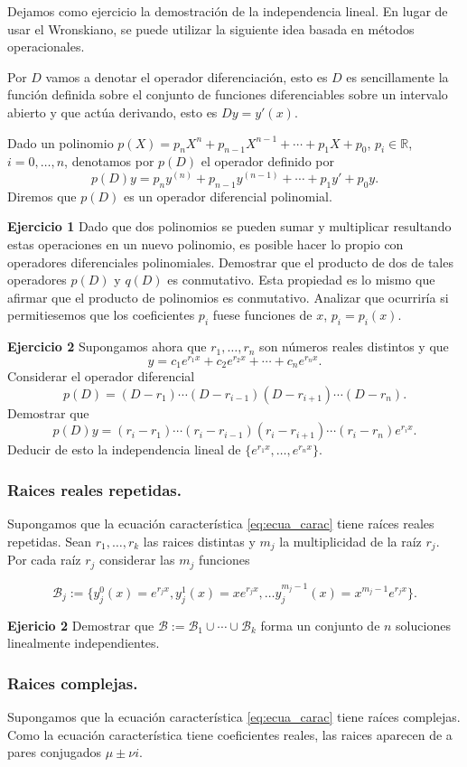 \documentclass{article}
\newcommand{\rr}{\mathbb{R}}
\renewcommand{\emph}[1]{\textcolor[rgb]{1,0,0}{#1}}
\begin{document}
Dejamos como ejercicio la demostración de la independencia lineal. En lugar de usar el Wronskiano, se puede utilizar  la siguiente idea basada en métodos operacionales. 

Por $D$ vamos a denotar el operador diferenciación, esto es $D$ es sencillamente la función  definida sobre el conjunto de funciones diferenciables sobre un intervalo abierto y que actúa derivando, esto es $Dy=y'(x)$. 

Dado un polinomio $p(X)=p_nX^n+p_{n-1}X^{n-1}+\cdots+p_1X+p_0$, $p_i\in\rr$, $i=0,\ldots,n$, denotamos por  $p(D)$ el operador definido por
\[p(D)y=p_ny^{(n)}+p_{n-1}y^{(n-1)}+\cdots+p_1y'+p_0y.\]
Diremos que $p(D)$ es un \emph{operador diferencial polinomial}. 

\textbf{Ejercicio 1} Dado que dos polinomios se pueden sumar y multiplicar resultando estas operaciones en un nuevo polinomio, es posible hacer lo propio con operadores diferenciales polinomiales. Demostrar que el producto de dos de tales operadores  $p(D)$ y $q(D)$ es conmutativo. Esta propiedad es lo mismo que afirmar que el producto de polinomios es conmutativo. Analizar que ocurriría si permitiesemos que los coeficientes $p_i$ fuese funciones de $x$, $p_i=p_i(x)$.
 
\textbf{Ejercicio 2} Supongamos ahora que $r_1,\ldots,r_n$ son números reales distintos y que 
\[y=c_1e^{r_1x}+c_2e^{r_2x}+\cdots+c_ne^{r_nx}.\]
Considerar el operador diferencial
\[p(D)=(D-r_1)\cdots(D-r_{i-1})(D-r_{i+1})\cdots(D-r_n).\]
Demostrar que
\[p(D)y=(r_i-r_1)\cdots(r_i-r_{i-1})(r_i-r_{i+1})\cdots(r_i-r_n)e^{r_ix}.\]
Deducir de esto la independencia lineal de $\{e^{r_1x},\ldots,e^{r_nx}\}$.


 
\subsubsection{Raices reales repetidas.}
Supongamos que la ecuación característica \eqref{eq:ecua_carac} tiene  raíces reales repetidas. Sean $r_1,\ldots,r_k$ las raices distintas y $m_j$ la multiplicidad de la raíz $r_j$. Por cada raíz $r_j$ considerar las $m_j$  funciones

\[\mathcal{B}_j:=\{y_j^0(x)=e^{r_jx}, y_j^1(x)=xe^{r_jx},\ldots y_j^{m_j-1}(x)=x^{m_j-1}e^{r_jx}\}.\]

 \textbf{Ejericio 2} Demostrar que $\mathcal{B}:=\mathcal{B}_1\cup\cdots\cup \mathcal{B}_k$ forma
 un conjunto de  $n$  soluciones linealmente independientes. 

\subsubsection{Raices complejas.}
Supongamos que la ecuación característica \eqref{eq:ecua_carac} tiene  raíces complejas. Como la ecuación característica tiene coeficientes reales, las raices aparecen de a pares conjugados $\mu\pm\nu i$. 
\end{document}

